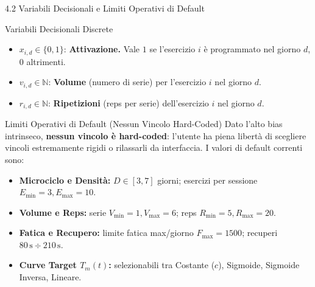 \documentclass[aspectratio=169, 10pt]{beamer}
\begin{document}
\begin{frame}{4.2 Variabili Decisionali e Limiti Operativi di Default}
    \begin{block}{Variabili Decisionali Discrete}
        \footnotesize
        \begin{itemize}
            \item $x_{i,d} \in \{0, 1\}$: \textbf{Attivazione.} Vale $1$ se l'esercizio $i$ è programmato nel giorno $d$, $0$ altrimenti.
            \item $v_{i,d} \in \mathbb{N}$: \textbf{Volume} (numero di serie) per l'esercizio $i$ nel giorno $d$.
            \item $r_{i,d} \in \mathbb{N}$: \textbf{Ripetizioni} (reps per serie) dell'esercizio $i$ nel giorno $d$.
        \end{itemize}
    \end{block}
    \vspace{-0.1cm}
    \begin{exampleblock}{Limiti Operativi di Default (Nessun Vincolo Hard-Coded)}
        \footnotesize
        Dato l'alto bias intrinseco, \textbf{nessun vincolo è hard-coded}: l'utente ha piena libertà di scegliere vincoli estremamente rigidi o rilassarli da interfaccia. I valori di default correnti sono:
        \begin{itemize}
            \item \textbf{Microciclo e Densità:} $D \in [3, 7]$ giorni; esercizi per sessione $E_{\min} = 3, E_{\max} = 10$.
            \item \textbf{Volume e Reps:} serie $V_{\min} = 1, V_{\max} = 6$; reps $R_{\min} = 5, R_{\max} = 20$.
            \item \textbf{Fatica e Recupero:} limite fatica max/giorno $F_{\max} = 1500$; recuperi $80\,\text{s} \div 210\,\text{s}$.
            \item \textbf{Curve Target $T_m(t)$:} selezionabili tra Costante ($c$), Sigmoide, Sigmoide Inversa, Lineare.
        \end{itemize}
    \end{exampleblock}
\end{frame}
\end{document}
